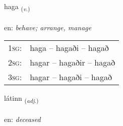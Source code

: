 \documentclass[frontgrid, backgrid]{flacards}\usepackage[]{graphicx}\usepackage[]{xcolor}
\begin{document}
\renewcommand{\flhead}{\vskip5pt \fboxsep=0pt {\small\bfseries\footnotesize Sagnorð | Verb}}
\renewcommand{\fcfoot}{\vskip5pt \fboxsep=0pt \hspace{2pt}{\small\bfseries\footnotesize 3K}}

\renewcommand{\blhead}{\vskip5pt {\small\bfseries\footnotesize Sagnorð | Verb }}
\renewcommand{\bcfoot}{\vskip5pt \hspace{2pt}{\small\bfseries\footnotesize 3K}}


{haga \small{\textsubscript{(\textit{v.})}} \\[1ex] %
\textphonetic{[haːɣa]} \\
en: \emph{behave; arrange, manage} \\  [2ex]
\renewcommand*{\arraystretch}{0.8}
\begin{tabular}{p{1cm}l}
\textsc{1sg}: & haga -- hagaði -- hagað \\ 
\textsc{2sg}: & hagar -- hagaðir -- hagað \\ 
\textsc{3sg}: & hagar -- hagaði -- hagað \\ 
\end{tabular}
}

\renewcommand{\flhead}{\vskip5pt \fboxsep=0pt {\small\bfseries\footnotesize Lýsingarorð | Adjective}}
\renewcommand{\fcfoot}{\vskip5pt \fboxsep=0pt \hspace{2pt}{\small\bfseries\footnotesize 3K}}

\renewcommand{\blhead}{\vskip5pt {\small\bfseries\footnotesize Lýsingarorð | Adjective }}
\renewcommand{\bcfoot}{\vskip5pt \hspace{2pt}{\small\bfseries\footnotesize 3K}}


{látinn \small{\textsubscript{(\textit{adj.})}} \\[1ex] %
\textphonetic{[lauːtɪn]} \\
en: \emph{deceased} \\  [2ex]
\renewcommand*{\arraystretch}{0.8}
}
\end{document}
